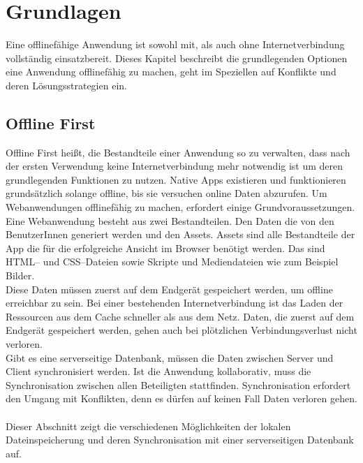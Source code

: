 \chapter{\label{chap:grundlagen}Grundlagen}
Eine offlinefähige Anwendung ist sowohl mit, als auch ohne Internetverbindung vollständig einsatzbereit.
Dieses Kapitel beschreibt die grundlegenden Optionen eine Anwendung offlinefähig zu machen, geht im Speziellen auf Konflikte und deren Lösungsstrategien ein.
%
%
\section{\label{chap:offlinefirst}Offline First}
Offline First heißt, die Bestandteile einer Anwendung so zu verwalten, dass nach der ersten Verwendung keine Internetverbindung mehr notwendig ist um deren grundlegenden Funktionen zu nutzen.
Native \Glspl{App} existieren und funktionieren grundsätzlich solange offline, bis sie versuchen online Daten abzurufen. Um Webanwendungen offlinefähig zu machen, erfordert einige Grundvoraussetzungen.\\
Eine Webanwendung besteht aus zwei Bestandteilen. Den Daten die von den BenutzerInnen generiert werden und den \gls{Assets}. \gls{Assets} sind alle Bestandteile der \gls{App} die für die erfolgreiche Ansicht im Browser benötigt werden. Das sind \gls{HTML}-- und \gls{CSS}--Dateien sowie Skripte und Mediendateien wie zum Beispiel Bilder.\\
Diese Daten müssen zuerst auf dem Endgerät gespeichert werden, um offline erreichbar zu sein.
Bei einer bestehenden Internetverbindung ist das Laden der Ressourcen aus dem Cache schneller als aus dem Netz. Daten, die zuerst auf dem Endgerät gespeichert werden, gehen auch bei plötzlichen Verbindungsverlust nicht verloren.\\
Gibt es eine serverseitige Datenbank, müssen die Daten zwischen Server und Client synchronisiert werden. Ist die Anwendung kollaborativ, muss die Synchronisation zwischen allen Beteiligten stattfinden. Synchronisation erfordert den Umgang mit Konflikten, denn es dürfen auf keinen Fall Daten verloren gehen.\\\\
Dieser Abschnitt zeigt die verschiedenen Möglichkeiten der lokalen Dateinspeicherung und deren Synchronisation mit einer serverseitigen Datenbank auf.
%
%

%
%

